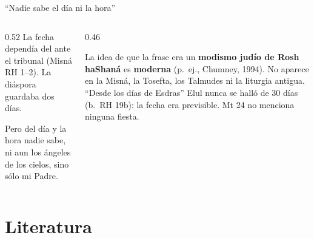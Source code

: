 \begin{frame}{``Nadie sabe el día ni la hora''}
\begin{columns}[t,onlytextwidth]
\begin{column}{0.52\textwidth}\small\RaggedRight
La fecha dependía del  ante el tribunal (Misná RH 1--2). La diáspora guardaba dos días.\par\medskip
\begin{cita}Pero del día y la hora nadie sabe, ni aun los ángeles de los cielos, sino sólo mi Padre.\end{cita}
\end{column}
\begin{column}{0.46\textwidth}
\begin{tcolorbox}[colback=papiro,colframe=tierraroja,boxrule=1pt,arc=3pt,fontupper=\scriptsize,title={Precisión fuerte},fonttitle=\bfseries\scriptsize,colbacktitle=tierraroja,coltitle=papiro]
\RaggedRight La idea de que la frase era un \textbf{modismo judío de Rosh haShaná} es \textbf{moderna} (p.~ej., Chumney, 1994). No aparece en la Misná, la Tosefta, los Talmudes ni la liturgia antigua. ``Desde los días de Esdras'' Elul nunca se halló de 30 días (b.~RH 19b): la fecha era previsible. Mt 24 no menciona ninguna fiesta.
\end{tcolorbox}
\end{column}
\end{columns}
\end{frame}

\section{Literatura}

